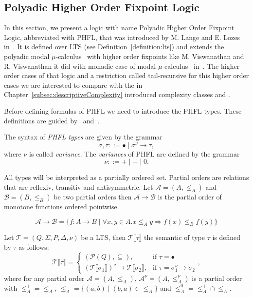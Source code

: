 
\subsection{Polyadic Higher Order Fixpoint Logic}\label{subsec:polyadicHigherOrderFixpointLogic}

In this section, we present a logic with name Polyadic Higher Order Fixpoint Logic, abbreviated with PHFL, that was
introduced by M. Lange and E. Lozes in~\cite{lange2014capturing}. It is defined over LTS (see
Definition~\ref{definition:lts}) and extends the polyadic modal $\mu$-calculus~\cite{otto1999bisimulation} with
higher order fixpoints like M. Viswanathan and R. Viswanathan it did with monadic case of modal
$\mu$-calculus~\cite{kozen1983results} in~\cite{viswanathan2004higher}. The higher order cases of that logic and a
restriction called tail-recursive for this higher order cases we are interested to compare with the in
Chapter~\ref{subsec:descriptiveComplexity} introduced complexity classes  and .

Before defining formulas of PHFL we need to introduce the PHFL types. These definitions are guided
by~\cite{viswanathan2004higher} and~\cite{lange2014capturing}.

\begin{definition}
    The syntax of \emph{PHFL types} are given by the grammar
    \[\sigma, \tau ::= \bullet \mid \sigma^\nu \rightarrow \tau,\]
    where $\nu$ is called \textit{variance}. The \emph{variances} of PHFL are defined by the grammar
    \[\nu ::= + \mid - \mid 0.\]
\end{definition}

All types will be interpreted as a partially ordered set. Partial orders are relations that are reflexiv, transitiv
and antisymmetric. Let $\mathcal{A} = (A, \leq_A)$ and $\mathcal{B} = (B, \leq_B)$ be two partial orders then
$\mathcal{A} \rightarrow \mathcal{B}$ is the partial order of monotone functions ordered pointwise.

\[\mathcal{A} \rightarrow \mathcal{B} = \{f:A\rightarrow B \mid \forall x,y \in A. x\leq_A y\Rightarrow f(x)\leq_B f(y)\}\]

\begin{definition}
    Let $\mathcal{T} = (Q, \Sigma, P, \Delta, \nu)$ be a LTS, then $\mathcal{T}\llbracket\tau\rrbracket$ the semantic
    of type $\tau$ is defined by $\tau$ as follows:
        \[\mathcal{T}\llbracket\tau\rrbracket=
        \begin{cases}
            (\mathscr{P}(Q), \subseteq),  & \text{if }\tau = \bullet\\
            (\mathcal{T}\llbracket\sigma_1\rrbracket)^\nu \rightarrow \mathcal{T}\llbracket\sigma_2\rrbracket, &
            \text{if }\tau = \sigma_1^\nu\rightarrow \sigma_2
        \end{cases},\]
    where for any partial order $\mathcal{A} = (A, \leq_A)$, $\mathcal{A}^\nu = (A, \leq_A^\nu)$ is a partial order
    with $\leq_A^+ = \leq_A$, $\leq_A^- = \{(a, b) \mid (b, a) \in \leq_A\}$ and $\leq_A^0 = \leq_A^+ \cap \leq_A^-$.
\end{definition}

